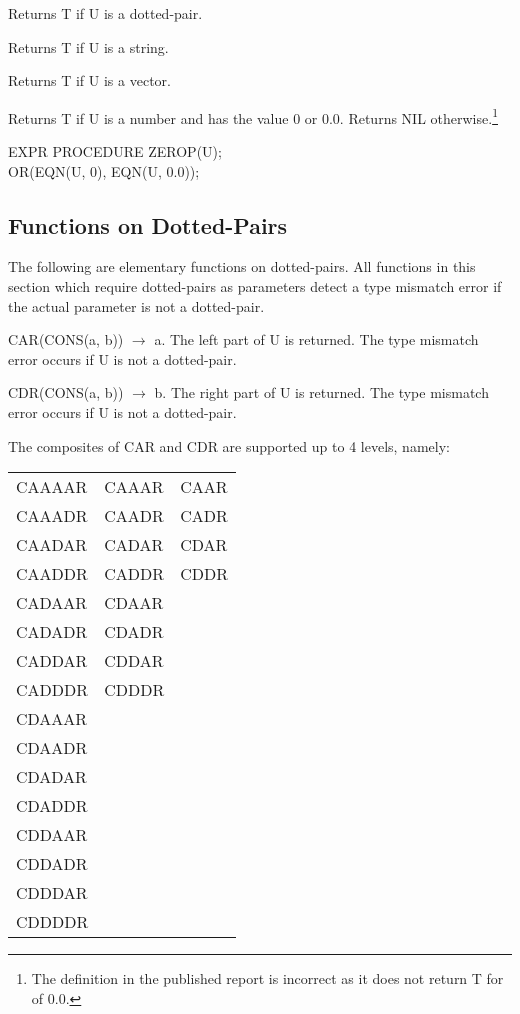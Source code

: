 \documentclass[11pt,letterpaper]{book}
\begin{document}
{Returns T if U is a dotted-pair. }


{Returns T if U is a string. }


{Returns T if U is a vector. }


{Returns T if U is a number and has the value 0 or 0.0.  Returns NIL
otherwise.\footnote{The definition in the published report is
incorrect as it does not return T for  of 0.0.}

{\tt \begin{tabbing} EXPR PROCEDURE ZEROP(U); \\
\hspace*{1em} OR(EQN(U, 0), EQN(U, 0.0));
\end{tabbing}}}


\subsection{Functions on Dotted-Pairs}

The following are elementary functions on dotted-pairs. All functions
in this section which require dotted-pairs as parameters detect a type
mismatch error if the actual parameter is not a dotted-pair.



{CAR(CONS(a, b)) $\rightarrow$ a. The left part of U is returned. The
type
mismatch error occurs if U is not a dotted-pair.}


{CDR(CONS(a, b)) $\rightarrow$ b. The right part of U is returned. The
type
mismatch error occurs if U is not a dotted-pair.}


The composites of CAR and CDR are supported up to 4 levels, namely:
 

\hspace*{1in}\begin{tabular}{l l l}
CAAAAR & CAAAR & CAAR \\ CAAADR & CAADR & CADR \\ CAADAR & CADAR &
CDAR \\ CAADDR & CADDR & CDDR \\ CADAAR & CDAAR & \\ CADADR & CDADR &
\\ CADDAR & CDDAR & \\ CADDDR & CDDDR & \\ CDAAAR & & \\ CDAADR & & \\
CDADAR & & \\ CDADDR & & \\ CDDAAR & & \\ CDDADR & & \\ CDDDAR & & \\
CDDDDR & &
\end{tabular}
\end{document}
